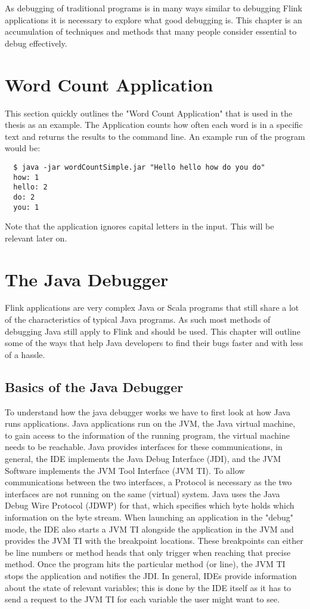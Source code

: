 As debugging of traditional programs is in many ways similar to debugging Flink applications it is necessary to explore what good debugging is. This chapter is an accumulation of techniques and methods that many people consider essential to debug effectively.

\section{Word Count Application}
\label{wordCountApplication}
This section quickly outlines the "Word Count Application" that is used in the thesis as an example. The Application counts how often each word is in a specific text and returns the results to the command line. An example run of the program would be:

\begin{lstlisting}
  $ java -jar wordCountSimple.jar "Hello hello how do you do"
  how: 1
  hello: 2
  do: 2
  you: 1
\end{lstlisting}

Note that the application ignores capital letters in the input. This will be relevant later on.

\section{The Java Debugger}

Flink applications are very complex Java or Scala programs that still share a lot of the characteristics of typical Java programs. As such most methods of debugging Java still apply to Flink and should be used. This chapter will outline some of the ways that help Java developers to find their bugs faster and with less of a hassle.

\subsection{Basics of the Java Debugger}

To understand how the java debugger works we have to first look at how Java runs applications. Java applications run on the JVM, the Java virtual machine, to gain access to the information of the running program, the virtual machine needs to be reachable. Java provides interfaces for these communications, in general, the IDE implements the Java Debug Interface (JDI), and the JVM Software implements the JVM Tool Interface (JVM TI). To allow communications between the two interfaces, a Protocol is necessary as the two interfaces are not running on the same (virtual) system. Java uses the Java Debug Wire Protocol (JDWP) for that, which specifies which byte holds which information on the byte stream. When launching an application in the "debug" mode, the IDE also starts a JVM TI alongside the application in the JVM and provides the JVM TI with the breakpoint locations. These breakpoints can either be line numbers or method heads that only trigger when reaching that precise method. Once the program hits the particular method (or line), the JVM TI stops the application and notifies the JDI. In general, IDEs provide information about the state of relevant variables; this is done by the IDE itself as it has to send a request to the JVM TI for each variable the user might want to see.

